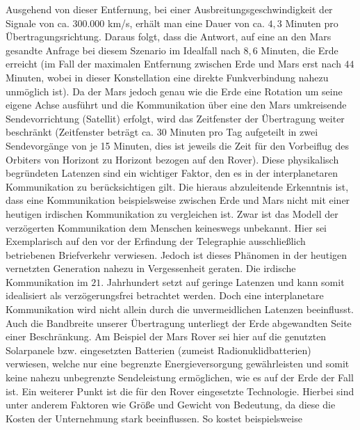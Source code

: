 Ausgehend von dieser Entfernung, bei einer Ausbreitungsgeschwindigkeit der
Signale von ca. $300.000$ km/s, erh{\"a}lt man eine Dauer von ca. $4,3$ Minuten
pro {\"U}bertragungsrichtung. Daraus folgt, dass die Antwort, auf eine an den
Mars gesandte Anfrage bei diesem Szenario im Idealfall nach $8,6$
Minuten, die Erde erreicht (im Fall der maximalen Entfernung zwischen Erde und
Mars erst nach $44$ Minuten, wobei in dieser Konstellation eine direkte
Funkverbindung nahezu unm{\"o}glich ist). Da der Mars jedoch genau wie die Erde
eine Rotation um seine eigene Achse ausf{\"u}hrt und die Kommunikation {\"u}ber eine den Mars
umkreisende Sendevorrichtung (Satellit) erfolgt, wird das Zeitfenster der
{\"U}bertragung weiter beschr{\"a}nkt (Zeitfenster betr{\"a}gt ca. 30 Minuten
pro Tag aufgeteilt in zwei Sendevorg{\"a}nge von je 15 Minuten, dies ist jeweils
die Zeit f{\"u}r den Vorbeiflug des Orbiters von Horizont zu Horizont bezogen
auf den Rover).\newline \newline
Diese physikalisch begr{\"u}ndeten Latenzen sind ein wichtiger Faktor, den es in
der interplanetaren Kommunikation zu ber{\"u}cksichtigen gilt. Die hieraus
abzuleitende Erkenntnis ist, dass eine Kommunikation beispielsweise zwischen
Erde und Mars nicht mit einer heutigen irdischen Kommunikation zu vergleichen
ist. Zwar ist das Modell der verz{\"o}gerten Kommunikation dem Menschen
keineswegs unbekannt.
Hier sei Exemplarisch auf den vor der Erfindung der Telegraphie
ausschlie{\ss}lich betriebenen Briefverkehr verwiesen. Jedoch ist dieses
Ph{\"a}nomen in der heutigen vernetzten Generation nahezu in Vergessenheit
geraten. Die irdische Kommunikation im $21$. Jahrhundert setzt auf geringe
Latenzen und kann somit idealisiert als verz{\"o}gerungsfrei betrachtet werden.
Doch eine interplanetare Kommunikation wird nicht allein durch die
unvermeidlichen Latenzen beeinflusst. Auch die Bandbreite unserer
{\"U}bertragung unterliegt der Erde abgewandten Seite einer Beschr{\"a}nkung. Am
Beispiel der Mars Rover sei hier auf die genutzten Solarpanele bzw. eingesetzten
Batterien (zumeist Radionuklidbatterien) verwiesen, welche nur eine begrenzte
Energieversorgung gew{\"a}hrleisten und somit keine nahezu unbegrenzte
Sendeleistung erm{\"o}glichen, wie es auf der Erde der Fall ist.\newline
Ein weiterer Punkt ist die f{\"u}r den Rover eingesetzte Technologie. Hierbei 
sind unter anderem Faktoren wie Gr{\"o}{\ss}e und Gewicht von Bedeutung, da 
diese die Kosten der Unternehmung stark beeinflussen. So kostet beispielsweise 
